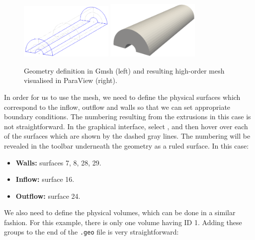 \begin{figure}
  \begin{center}
    \includegraphics[width=0.4\textwidth]{utilities/Figures/mc-example-gmsh}
    \includegraphics[width=0.4\textwidth]{utilities/Figures/mc-example-mesh}
  \end{center}
  \caption{Geometry definition in Gmsh (left) and resulting high-order mesh
    visualised in ParaView (right).}
  \label{fig:util:mc:gmsh-example}
\end{figure}

In order for us to use the mesh, we need to define the physical surfaces which
correspond to the inflow, outflow and walls so that we can set appropriate
boundary conditions. The numbering resulting from the extrusions in this case is
not straightforward. In the graphical interface, select , and then hover over each of the surfaces
which are shown by the dashed gray lines. The numbering will be revealed in the
toolbar underneath the geometry as a ruled surface. In this case:
%
\begin{itemize}
\item \textbf{Walls:} surfaces 7, 8, 28, 29.
\item \textbf{Inflow:} surface 16.
\item \textbf{Outflow:} surface 24.
\end{itemize}
%
We also need to define the physical volumes, which can be done in a similar
fashion. For this example, there is only one volume having ID 1. Adding these
groups to the end of the \texttt{.geo} file is very straightforward:

